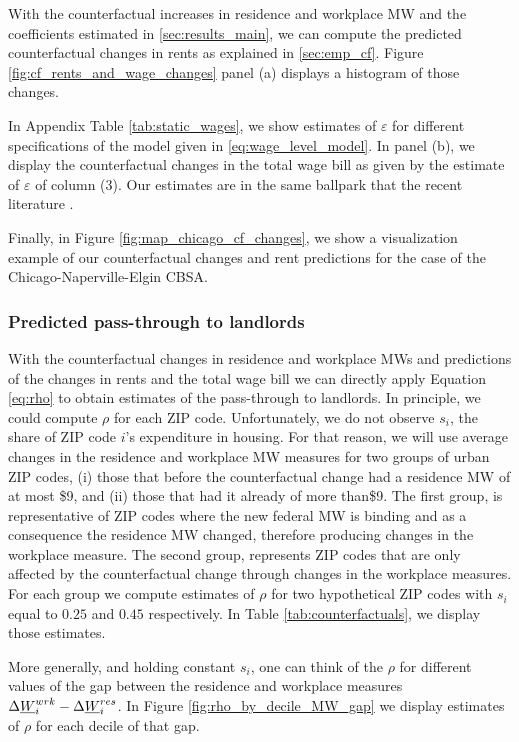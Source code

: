 With the counterfactual increases in residence and workplace MW and the 
coefficients estimated in \ref{sec:results_main}, we can compute the predicted 
counterfactual changes in rents as explained in \ref{sec:emp_cf}. Figure 
\ref{fig:cf_rents_and_wage_changes} panel (a) displays a histogram of those 
changes. 


In Appendix Table \ref{tab:static_wages}, we show estimates of $\varepsilon$ for different 
specifications of the model given in \ref{eq:wage_level_model}. In panel (b), we display 
the counterfactual changes in the total wage bill as given by the estimate of $\varepsilon$ 
of column (3). Our estimates are in the same ballpark that the recent literature \parencite{CegnizEtAl2019}.


Finally, in Figure \ref{fig:map_chicago_cf_changes}, we show a visualization example 
of our counterfactual changes and rent predictions for the case of the 
Chicago-Naperville-Elgin CBSA. 


\subsubsection{Predicted pass-through to landlords}\label{sec:rho}

With the counterfactual changes in residence and workplace MWs and predictions of 
the changes in rents and the total wage bill we can directly apply Equation \ref{eq:rho} 
to obtain estimates of the pass-through to landlords. In principle, we could compute $\rho$ 
for each ZIP code. Unfortunately, we do not observe $s_i$, the share of ZIP code $i$'s 
expenditure in housing. For that reason, we will use average changes in the residence and 
workplace MW measures for two groups of urban ZIP codes, (i) those that before the counterfactual 
change had a residence MW of at most \$9, and (ii) those that had it already of more than\$9. The 
first group, is representative of ZIP codes where the new federal MW is binding and as a consequence 
the residence MW changed, therefore producing changes in the workplace measure. The second group, 
represents ZIP codes that are only affected by the counterfactual change through changes in the 
workplace measures.
For each group we compute estimates of $\rho$ for two hypothetical ZIP codes with $s_i$ equal to 
$0.25$ and $0.45$ respectively. In Table \ref{tab:counterfactuals}, we display those estimates.


More generally, and holding constant $s_i$, one can think of the $\rho$ for different values
of the gap between the residence and workplace measures $\Delta \underline{W}_i^{wrk} - \Delta \underline{W}_i^{res}$.
In Figure \ref{fig:rho_by_decile_MW_gap} we display estimates of $\rho$ for each decile of that gap.




